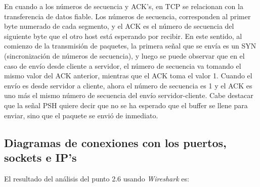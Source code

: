 \documentclass[12pt]{article}
\begin{document}
En cuando a los números de secuencia y ACK's, en TCP se relacionan con la transferencia de datos fiable. Los números de secuencia, corresponden al primer byte numerado de cada segmento, y el ACK es el número de secuencia del siguiente byte que el otro host está esperando por recibir. En este sentido, al comienzo de la transmisión de paquetes, la primera señal que se envía es un SYN (sincronización de números de secuencia), y luego se puede observar que en el caso de envío desde cliente a servidor, el número de secuencia  va tomando el mismo valor del ACK anterior, mientras que el ACK toma el valor 1. Cuando el envío es desde servidor a cliente, ahora el número de secuencia es 1 y el ACK es uno más el mismo número de secuencia del envío servidor-cliente. Cabe destacar que la señal PSH quiere decir que no se ha esperado que el buffer se llene para enviar, sino que el paquete se envió de inmediato.

\newpage

\subsection{Diagramas de conexiones con los puertos, sockets e IP's}
El resultado del análisis del punto 2.6 usando \emph{Wireshark} es:\\
\end{document}
